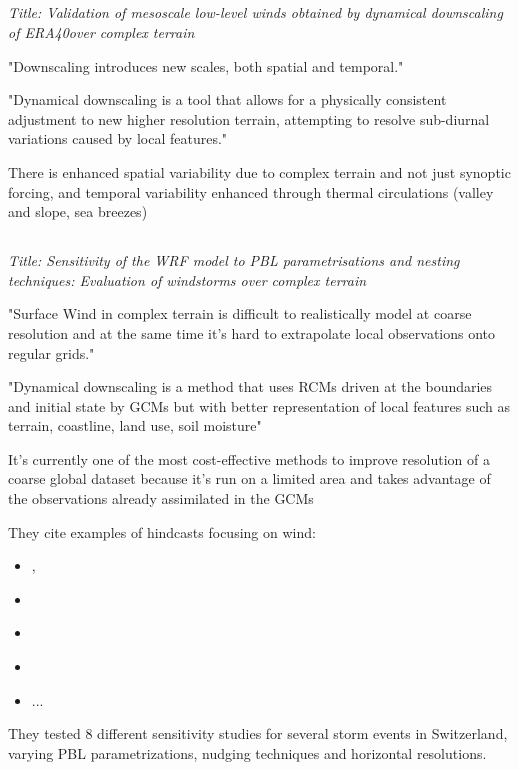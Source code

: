 \documentclass[12pt,a4paper]{article}
\begin{document}
\subsection{\cite{Zagar2006}}

\textit{Title: Validation of mesoscale low-level winds obtained by dynamical downscaling of ERA40over complex terrain}
 
"Downscaling introduces new scales, both spatial and temporal."

"Dynamical downscaling is a tool that allows for a physically consistent adjustment to new higher resolution terrain, attempting to resolve sub-diurnal variations caused by local features."

There is enhanced spatial variability due to complex terrain and not just synoptic forcing, and temporal variability enhanced through thermal circulations (valley and slope, sea breezes) 


\subsection{\cite{Gomez-Navarro2015}}

\textit{Title:  Sensitivity of the WRF model to PBL parametrisations and nesting techniques: Evaluation of windstorms over complex terrain}

"Surface Wind in complex terrain is difficult to realistically model at coarse resolution and at the same time it's hard to extrapolate local observations onto regular grids."

"Dynamical downscaling is a method that uses RCMs driven at the boundaries and initial state by GCMs but with better representation of local features such as terrain, coastline, land use, soil moisture"

It's currently one of the most cost-effective methods to improve resolution of a coarse global dataset because it's run on a limited area and takes advantage of the observations already assimilated in the GCMs

They cite examples of hindcasts focusing on wind: 

\begin{itemize}
    \item \cite{Jimenez2010}, 
    \item \cite{Garcia-Diez2015}
    \item \cite{Menendez2014a}
    \item \cite{Lorente-Plazas2015}
    \item ...
\end{itemize}
They tested 8 different sensitivity studies for several storm events in Switzerland, varying  \gls{PBL} parametrizations, nudging techniques and horizontal resolutions.
\end{document}
